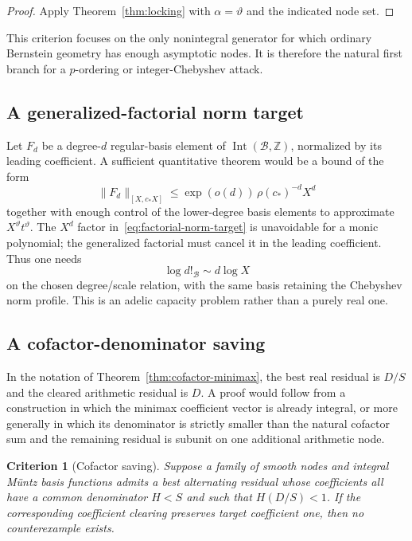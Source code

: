 \documentclass[11pt,oneside]{article}
\newtheorem{criterion}[theorem]{Criterion}
\theoremstyle{definition}
\theoremstyle{remark}
\newcommand{\Z}{\mathbb Z}
\newcommand{\Bsem}{\mathcal B}
\newcommand{\Int}{\operatorname{Int}}
\newcommand{\thetaq}{\vartheta}
\begin{document}
\begin{proof}
Apply Theorem~\ref{thm:locking} with $\alpha=\thetaq$ and the indicated node set.
\end{proof}

This criterion focuses on the only nonintegral generator for which ordinary Bernstein
geometry has enough asymptotic nodes.  It is therefore the natural first branch for a
$p$-ordering or integer-Chebyshev attack.

\subsection{A generalized-factorial norm target}

Let $F_d$ be a degree-$d$ regular-basis element of $\Int(\Bsem,\Z)$, normalized by its leading
coefficient.  A sufficient quantitative theorem would be a bound of the form
\begin{equation}
 \|F_d\|_{[X,c_*X]}
 \le \exp(o(d))\,\rho(c_*)^{-d}X^d
 \label{eq:factorial-norm-target}
\end{equation}
together with enough control of the lower-degree basis elements to approximate
$X^{\thetaq}t^{\thetaq}$.  The $X^d$ factor in~\eqref{eq:factorial-norm-target} is unavoidable
for a monic polynomial; the generalized factorial must cancel it in the leading coefficient.
Thus one needs
\[
 \log d!_{\Bsem}\sim d\log X
\]
on the chosen degree/scale relation, with the same basis retaining the Chebyshev norm profile.
This is an adelic capacity problem rather than a purely real one.

\subsection{A cofactor-denominator saving}

In the notation of Theorem~\ref{thm:cofactor-minimax}, the best real residual is $D/S$ and the
cleared arithmetic residual is $D$.  A proof would follow from a construction in which the
minimax coefficient vector is already integral, or more generally in which its denominator
is strictly smaller than the natural cofactor sum and the remaining residual is subunit on
one additional arithmetic node.

\begin{criterion}[Cofactor saving]
\label{crit:cofactor-saving}
Suppose a family of smooth nodes and integral M\"untz basis functions admits a best
alternating residual whose coefficients all have a common denominator $H<S$ and such that
$H(D/S)<1$.  If the corresponding coefficient clearing preserves target coefficient one,
then no counterexample exists.
\end{criterion}
\end{document}
